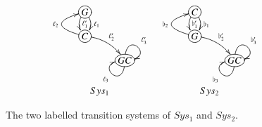 \begin{figure}
\[
\begin{array}{cc}
\xymatrix@R-1pc{
*+[o][F-]{G} \ar@/ ^/[d]^{\ell_1} \ar@/_/[d]^{\ell'_1} \\
*+[o][F-]{C} \ar@/^2pc/[u]^{\ell_2} \ar@/^/[dr]^{\ell'_2} \\ %
& *+[o][F-]{GC}\ar@(d,l)^{\ell_3}\ar@(u,r)^{\ell'_3}
}
&
\xymatrix@R-1pc{
*+[o][F-]{C} \ar@/ ^/[d]^{\flat_1} \ar@/_/[d]^{\flat'_1} \\
*+[o][F-]{G} \ar@/^2pc/[u]^{\flat_2} \ar@/^/[dr]^{\flat'_2} \\ 
& *+[o][F-]{GC}\ar@(d,l)^{\flat_3}\ar@(u,r)^{\flat'_3}
}\\
Sys_1 & Sys_2
\end{array}
\]
\caption{The two labelled transition systems of $Sys_1$ and $Sys_2$.}\label{fig:ltss}
\end{figure}